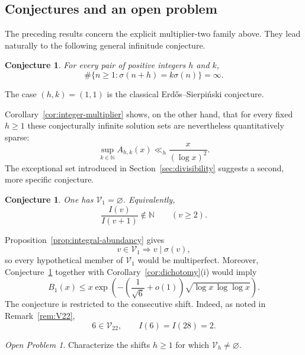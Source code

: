\documentclass[11pt,reqno]{amsart}
\numberwithin{equation}{section}
\theoremstyle{plain}
\newtheorem{conjecture}[theorem]{Conjecture}
\theoremstyle{definition}
\theoremstyle{remark}
\newtheorem{openproblem}[theorem]{Open Problem}
\newcommand{\N}{\mathbb N}
\begin{document}
\subsection{Conjectures and an open problem}

The preceding results concern the explicit multiplier-two family above.
They lead naturally to the following general infinitude conjecture.

\begin{conjecture}\label{conj:generalized-ES}
For every pair of positive integers $h$ and $k$,
\[
\#\{n\ge1:\sigma(n+h)=k\sigma(n)\}=\infty.
\]
\end{conjecture}
The case $(h,k)=(1,1)$ is the classical Erd\H{o}s--Sierpi\'nski conjecture.

Corollary~\ref{cor:integer-multiplier} shows, on the other hand, that for every fixed $h\ge1$ these conjecturally infinite solution sets are nevertheless
quantitatively sparse:
\[
\sup_{k\in\N}A_{h,k}(x)\ll_h\frac{x}{(\log x)^2}.
\]
The exceptional set introduced in Section~\ref{sec:divisibility} suggests a second, more specific conjecture.

\begin{conjecture}\label{conj:V1}
One has $\mathcal V_1=\varnothing$. Equivalently,
\[
\frac{I(v)}{I(v+1)}\notin\N\qquad(v\ge2).
\]
\end{conjecture}
Proposition~\ref{prop:integral-abundancy} gives
\[
v\in\mathcal V_1\Longrightarrow v\mid\sigma(v),
\]
so every hypothetical member of $\mathcal V_1$ would be multiperfect. Moreover, Conjecture~\ref{conj:V1} together with Corollary~\ref{cor:dichotomy}\textup{(i)} would imply
\[
B_1(x)
\le
x\exp\!\left(
-\left(\frac1{\sqrt6}+o(1)\right)\sqrt{\log x\,\log\log x}
\right).
\]
The conjecture is restricted to the consecutive shift. Indeed, as noted in Remark~\ref{rem:V22},
\[
6\in\mathcal V_{22},\qquad I(6)=I(28)=2.
\]

\begin{openproblem}\label{prob:characterize-Vh}
Characterize the shifts $h\ge1$ for which $\mathcal V_h\ne\varnothing$.
\end{openproblem}


\printbibliography
\nocite{Fatehizadeh2026}
\end{document}
